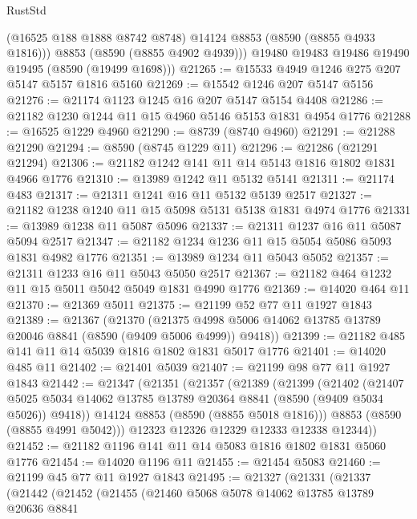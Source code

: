 \begin{lexlean}{RustStd}
\begin{coremodule}
          (@16525 @188 @1888 @8742 @8748)
          @14124
          @8853
          (@8590 (@8855 @4933 @1816)))
        @8853
        (@8590 (@8855 @4902 @4939)))
      @19480
      @19483
      @19486
      @19490
      @19495
      (@8590 (@19499 @1698)))
@21265 := @15533 @4949 @1246 @275 @207 @5147 @5157 @1816 @5160
@21269 := @15542 @1246 @207 @5147 @5156
@21276 := @21174 @1123 @1245 @16 @207 @5147 @5154 @4408
@21286 := @21182 @1230 @1244 @11 @15 @4960 @5146 @5153 @1831 @4954 @1776
@21288 := @16525 @1229 @4960
@21290 := @8739 (@8740 @4960)
@21291 := @21288 @21290
@21294 := @8590 (@8745 @1229 @11)
@21296 := @21286 (@21291 @21294)
@21306 := @21182 @1242 @141 @11 @14 @5143 @1816 @1802 @1831 @4966 @1776
@21310 := @13989 @1242 @11 @5132 @5141
@21311 := @21174 @483
@21317 := @21311 @1241 @16 @11 @5132 @5139 @2517
@21327 := @21182 @1238 @1240 @11 @15 @5098 @5131 @5138 @1831 @4974 @1776
@21331 := @13989 @1238 @11 @5087 @5096
@21337 := @21311 @1237 @16 @11 @5087 @5094 @2517
@21347 := @21182 @1234 @1236 @11 @15 @5054 @5086 @5093 @1831 @4982 @1776
@21351 := @13989 @1234 @11 @5043 @5052
@21357 := @21311 @1233 @16 @11 @5043 @5050 @2517
@21367 := @21182 @464 @1232 @11 @15 @5011 @5042 @5049 @1831 @4990 @1776
@21369 := @14020 @464 @11
@21370 := @21369 @5011
@21375 := @21199 @52 @77 @11 @1927 @1843
@21389 := @21367
    (@21370
      (@21375 @4998 @5006 @14062 @13785 @13789 @20046 @8841 (@8590 (@9409 @5006 @4999)) @9418))
@21399 := @21182 @485 @141 @11 @14 @5039 @1816 @1802 @1831 @5017 @1776
@21401 := @14020 @485 @11
@21402 := @21401 @5039
@21407 := @21199 @98 @77 @11 @1927 @1843
@21442 := @21347
    (@21351
      (@21357
        (@21389
          (@21399
            (@21402
              (@21407
                @5025
                @5034
                @14062
                @13785
                @13789
                @20364
                @8841
                (@8590 (@9409 @5034 @5026))
                @9418))
            @14124
            @8853
            (@8590 (@8855 @5018 @1816)))
          @8853
          (@8590 (@8855 @4991 @5042)))
        @12323
        @12326
        @12329
        @12333
        @12338
        @12344))
@21452 := @21182 @1196 @141 @11 @14 @5083 @1816 @1802 @1831 @5060 @1776
@21454 := @14020 @1196 @11
@21455 := @21454 @5083
@21460 := @21199 @45 @77 @11 @1927 @1843
@21495 := @21327
    (@21331
      (@21337
        (@21442
          (@21452
            (@21455
              (@21460
                @5068
                @5078
                @14062
                @13785
                @13789
                @20636
                @8841

\end{coremodule}
\end{lexlean}
